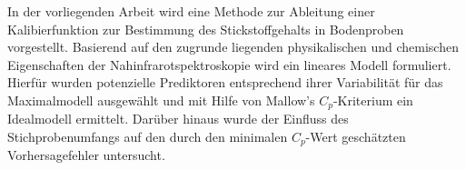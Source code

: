 In der vorliegenden Arbeit wird eine Methode zur Ableitung einer Kalibierfunktion zur Bestimmung des Stickstoffgehalts in Bodenproben vorgestellt.
Basierend auf den zugrunde liegenden physikalischen und chemischen Eigenschaften der Nahinfrarotspektroskopie wird ein lineares Modell formuliert. 
Hierfür wurden potenzielle Prediktoren entsprechend ihrer Variabilität für das Maximalmodell ausgewählt und mit Hilfe von Mallow's $C_p$-Kriterium ein Idealmodell ermittelt. 
Darüber hinaus wurde der Einfluss des Stichprobenumfangs auf den durch den minimalen $C_p$-Wert geschätzten Vorhersagefehler untersucht.